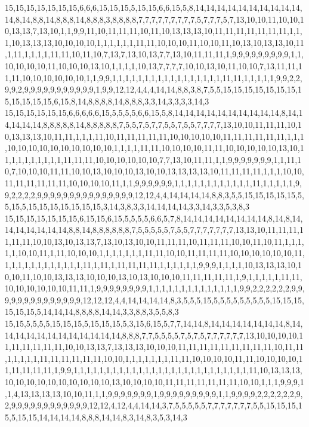 15,15,15,15,15,15,15,6,6,6,15,15,15,5,15,15,6,6,15,5,8,14,14,14,14,14,14,14,14,14,14,14,8,14,8,8,14,8,8,8,14,8,8,8,3,8,8,8,8,7,7,7,7,7,7,7,7,7,5,7,7,7,5,7,13,10,10,11,10,10,10,13,13,7,13,10,1,1,9,9,11,10,11,11,11,10,11,10,13,13,13,10,11,11,11,11,11,11,11,1,1,1,10,13,13,13,10,10,10,10,1,1,1,1,1,1,11,11,10,10,10,11,10,10,11,10,13,10,13,13,10,11,1,11,1,1,1,1,11,11,10,11,10,7,13,7,13,10,13,7,7,13,10,11,11,11,1,9,9,9,9,9,9,9,9,9,1,1,10,10,10,10,11,10,10,10,13,10,1,1,1,1,10,13,7,7,7,7,10,10,13,10,11,10,10,7,13,11,11,11,11,10,10,10,10,10,10,1,1,9,9,1,1,1,1,1,1,1,1,1,1,1,1,1,1,1,1,1,11,11,1,1,1,1,1,9,9,2,2,9,9,2,9,9,9,9,9,9,9,9,9,9,9,1,9,9,12,12,4,4,4,14,14,8,8,3,8,7,5,5,15,15,15,15,15,15,15,15,15,15,15,15,6,15,8,14,8,8,8,8,14,8,8,8,3,3,14,3,3,3,3,14,3
15,15,15,15,15,15,6,6,6,6,6,15,5,5,5,5,6,6,15,5,8,14,14,14,14,14,14,14,14,14,14,8,14,14,14,14,14,8,8,8,8,8,14,8,8,8,8,8,7,5,5,7,5,7,7,5,5,7,5,5,7,7,7,7,13,10,10,11,11,11,10,10,13,13,13,10,11,11,1,1,1,11,10,11,11,11,11,11,10,10,10,10,10,11,11,11,11,11,11,1,1,1,10,10,10,10,10,10,10,10,10,10,1,1,1,1,11,11,10,10,10,10,11,11,10,10,10,10,10,13,10,11,1,1,1,1,1,1,1,1,11,11,11,10,10,10,10,10,10,7,7,13,10,11,11,1,1,9,9,9,9,9,9,9,1,1,11,10,7,10,10,10,11,11,10,10,13,10,10,10,13,10,10,13,13,13,13,10,11,11,11,11,1,1,1,10,10,11,11,11,11,11,11,10,10,10,10,11,1,1,9,9,9,9,9,9,1,1,1,1,1,1,1,1,1,1,1,1,11,1,1,1,1,1,9,9,2,2,2,2,9,9,9,9,9,9,9,9,9,9,9,9,9,9,9,12,12,4,4,14,14,14,14,8,8,3,5,5,15,15,15,15,15,5,5,15,5,15,15,15,15,15,15,15,3,14,3,8,3,3,14,14,14,14,3,3,14,3,3,5,3,8,3
15,15,15,15,15,15,15,6,15,15,6,15,5,5,5,5,6,6,5,7,8,14,14,14,14,14,14,14,14,8,14,8,14,14,14,14,14,14,14,8,8,14,8,8,8,8,8,8,7,5,5,5,5,5,7,5,5,7,7,7,7,7,7,7,13,13,10,11,11,11,11,11,11,10,10,13,10,13,13,7,13,10,13,10,10,11,11,11,10,11,11,11,10,10,11,10,11,1,1,1,1,1,10,10,11,1,11,10,10,10,1,1,1,1,1,1,1,11,11,10,10,11,11,11,11,10,10,10,10,10,10,11,1,1,1,1,1,1,1,1,1,1,1,1,11,1,11,1,11,11,11,11,1,1,1,1,1,1,9,9,9,1,1,1,1,10,13,13,13,10,10,10,11,10,10,13,13,13,10,10,10,13,10,13,10,10,10,11,11,11,11,11,1,9,1,1,1,1,1,11,11,10,10,10,10,10,10,11,11,1,9,9,9,9,9,9,9,9,1,1,1,1,1,1,1,1,1,1,1,1,1,1,9,9,2,2,2,2,2,2,9,9,9,9,9,9,9,9,9,9,9,9,9,9,12,12,12,4,4,14,14,14,14,8,3,5,5,5,15,5,5,5,5,5,5,5,5,5,15,15,15,15,15,15,5,14,14,14,8,8,8,8,14,14,3,3,8,8,3,5,5,8,3
15,15,5,5,5,5,15,15,15,5,15,15,15,5,3,15,6,15,5,7,7,14,14,8,14,14,14,14,14,14,14,8,14,14,14,14,14,14,14,14,14,14,14,14,8,8,8,7,7,5,5,5,5,7,5,7,5,7,7,7,7,7,7,13,10,10,10,10,11,11,11,11,11,11,10,10,13,13,7,13,13,13,10,10,10,11,11,11,11,11,11,11,11,11,10,11,11,1,1,1,1,1,11,11,11,11,11,11,10,10,1,1,1,1,1,1,1,11,11,10,10,10,10,11,11,10,10,10,10,11,11,11,11,11,1,9,9,1,1,1,1,1,1,1,1,1,1,1,1,1,1,1,1,1,1,1,1,1,1,1,1,1,1,1,11,10,13,13,13,10,10,10,10,10,10,10,10,10,10,13,10,10,10,10,11,11,11,11,11,11,11,10,10,1,1,1,9,9,9,1,1,4,13,13,13,13,10,10,11,1,1,9,9,9,9,9,9,9,1,9,9,9,9,9,9,9,9,9,1,1,9,9,9,9,2,2,2,2,2,2,9,2,9,9,9,9,9,9,9,9,9,9,9,9,12,12,4,12,4,4,14,14,3,7,5,5,5,5,5,7,7,7,7,7,7,7,5,5,15,15,15,15,5,15,15,14,14,14,14,8,8,8,14,14,8,3,14,8,3,5,3,14,3
